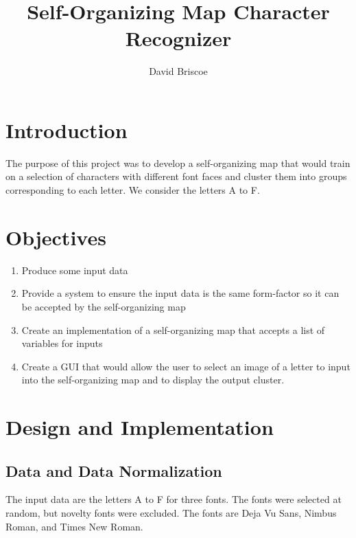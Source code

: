 \documentclass[12pt,letterpaper,oneside]{report}
\title{Self-Organizing Map Character Recognizer}
\author{ David Briscoe }
\begin{document}
\setcounter{page}{1}
\maketitle
\tableofcontents
\newpage

\setcounter{section}{0}
\setcounter{page}{1}

\doublespacing


\section{Introduction}
The purpose of this project was to develop a self-organizing map that would train on a selection of characters with different font faces and cluster them into groups corresponding to each letter. We consider the letters A to F.

\section{Objectives}

\begin{enumerate}
\item Produce some input data
\item Provide a system to ensure the input data is the same form-factor so it can be accepted by the self-organizing map
\item Create an implementation of a self-organizing map that accepts a list of variables for inputs
\item Create a GUI that would allow the user to select an image of a letter to input into the self-organizing map and to display the output cluster.
\end{enumerate}

\clearpage
\section{Design and Implementation}
\subsection{Data and Data Normalization}
The input data are the letters A to F for three fonts. The fonts were selected at random, but novelty fonts were excluded. The fonts are Deja Vu Sans, Nimbus Roman, and Times New Roman. 
\end{document}
